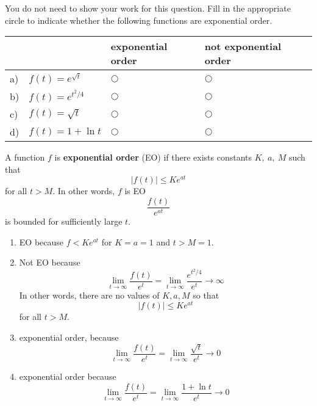 \ifnum {}
\question[2] You do not need to show your work for this question. Fill in the appropriate circle to indicate whether the following functions are exponential order. 
\vspace{-0.2cm}
\setlength{\extrarowheight}{0.10cm}
\begin{center}
\hspace{-.9cm}\begin{tabular}{ p{0.20cm} p{4cm} p{3.5cm} p{4cm} }
    & & exponential order &  not exponential order  \\[6pt] \hline 
    a) & $\displaystyle f(t) = e^{\sqrt t}$  & $\bigcirc$  & $\bigcirc$ \\[4pt] 
    b) & $f(t) = e^{t^2/4}$  & $\bigcirc$  & $\bigcirc$ \\[4pt] 
    c) & $f(t) = \sqrt{t}$ & $\bigcirc$  & $\bigcirc$ \\[4pt]  
    d) & $f(t) = 1+\ln t$  & $\bigcirc$  & $\bigcirc$ \\[4pt]  

    \hline
\end{tabular}
\end{center}
\setlength{\extrarowheight}{0.0cm}
\ifnum {} {\color{DarkBlue} A function 
$f$ is \textbf{exponential order} (EO) if there exists constants $K, \ a, \ M$ such that $$  |f(t)| \leq Ke^{at}  $$ for all $t > M$. In other words, $f$ is EO $$ \frac{f(t)}{e^{at}}  $$ is bounded for sufficiently large $t$.
\begin{enumerate}[label=(\alph*)]
    \item EO because $f < Ke^{at}$ for $K=a=1$ and $t > M=1$. 
    \item Not EO because 
    $$\lim_{t\to \infty}\frac{f(t)}{e^{t}} = \lim_{t\to \infty}\frac{e^{t^2/4}}{e^t} \to \infty$$ In other words, there are no values of $K,a,M$ so that $$  |f(t)| \leq Ke^{at}  $$ for all $t > M$.
    \item exponential order, because $$\lim_{t\to \infty}\frac{f(t)}{e^t} = \lim_{t\to \infty}\frac{\sqrt t}{e^t} \to 0$$    
    \item exponential order because $$\lim_{t\to \infty}\frac{f(t)}{e^t} = \lim_{t\to \infty}\frac{1+\ln t}{e^t} \to 0$$
\end{enumerate}
}
\fi
\vspace{-6pt} 
\fi 




